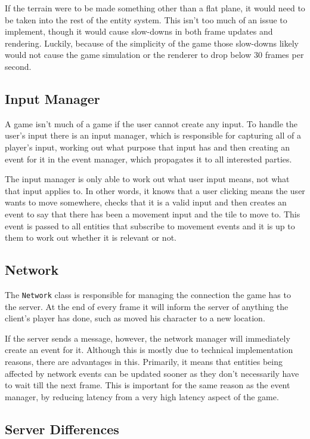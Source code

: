 If the terrain were to be made something other than a flat plane, it would need to be taken into the rest of the entity system. This isn't too much of an issue to implement, though it would cause slow-downs in both frame updates and rendering. Luckily, because of the simplicity of the game those slow-downs likely would not cause the game simulation or the renderer to drop below 30 frames per second.

\subsection{Input Manager}
A game isn't much of a game if the user cannot create any input. To handle the user's input there is an input manager, which is responsible for capturing all of a player's input, working out what purpose that input has and then creating an event for it in the event manager, which propagates it to all interested parties.

The input manager is only able to work out what user input means, not what that input applies to. In other words, it knows that a user clicking means the user wants to move somewhere, checks that it is a valid input and then creates an event to say that there has been a movement input and the tile to move to. This event is passed to all entities that subscribe to movement events and it is up to them to work out whether it is relevant or not.

\subsection{Network}
The \texttt{Network} class is responsible for managing the connection the game has to the server. At the end of every frame it will inform the server of anything the client's player has done, such as moved his character to a new location.

If the server sends a message, however, the network manager will immediately create an event for it. Although this is mostly due to technical implementation reasons, there are advantages in this. Primarily, it means that entities being affected by network events can be updated sooner as they don't necessarily have to wait till the next frame. This is important for the same reason as the event manager, by reducing latency from a very high latency aspect of the game.

\subsection{Server Differences}

